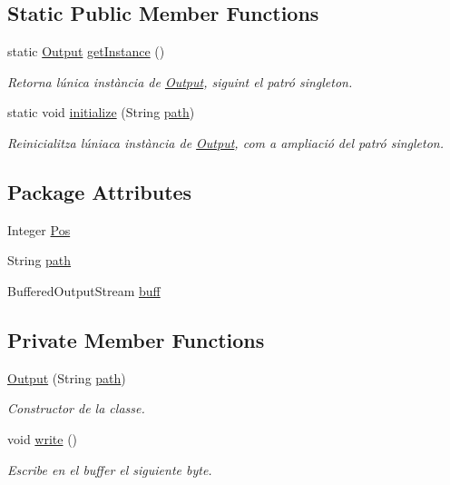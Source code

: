 \subsection*{Static Public Member Functions}
\begin{DoxyCompactItemize}
\item 
static \hyperlink{classpersistencia_1_1output_1_1Output}{Output} \hyperlink{classpersistencia_1_1output_1_1Output_a0882482880e36bf5dc9bd78bb36cec75}{get\+Instance} ()
\begin{DoxyCompactList}\small\item\em Retorna l\textquotesingle{}única instància de \hyperlink{classpersistencia_1_1output_1_1Output}{Output}, siguint el patró singleton. \end{DoxyCompactList}\item 
static void \hyperlink{classpersistencia_1_1output_1_1Output_a3c6c71990389c7142f5f362906c44f1a}{initialize} (String \hyperlink{classpersistencia_1_1output_1_1Output_aebef717882f3bcc7080dec014c6714c9}{path})
\begin{DoxyCompactList}\small\item\em Reinicialitza l\textquotesingle{}úniaca instància de \hyperlink{classpersistencia_1_1output_1_1Output}{Output}, com a ampliació del patró singleton. \end{DoxyCompactList}\end{DoxyCompactItemize}
\subsection*{Package Attributes}
\begin{DoxyCompactItemize}
\item 
Integer \hyperlink{classpersistencia_1_1output_1_1Output_a3709182600423f7e57644ccdd0016f22}{Pos}
\item 
String \hyperlink{classpersistencia_1_1output_1_1Output_aebef717882f3bcc7080dec014c6714c9}{path}
\item 
Buffered\+Output\+Stream \hyperlink{classpersistencia_1_1output_1_1Output_ae8f22fd92b020c318f6f377cf3ac39de}{buff}
\end{DoxyCompactItemize}
\subsection*{Private Member Functions}
\begin{DoxyCompactItemize}
\item 
\hyperlink{classpersistencia_1_1output_1_1Output_acbb70ea9eabb2a6d0b2d7bd2f3c9009a}{Output} (String \hyperlink{classpersistencia_1_1output_1_1Output_aebef717882f3bcc7080dec014c6714c9}{path})
\begin{DoxyCompactList}\small\item\em Constructor de la classe. \end{DoxyCompactList}\item 
void \hyperlink{classpersistencia_1_1output_1_1Output_a57be8c4ed429f03caa5c2bcc97e2260d}{write} ()
\begin{DoxyCompactList}\small\item\em Escribe en el buffer el siguiente byte. \end{DoxyCompactList}\end{DoxyCompactItemize}
